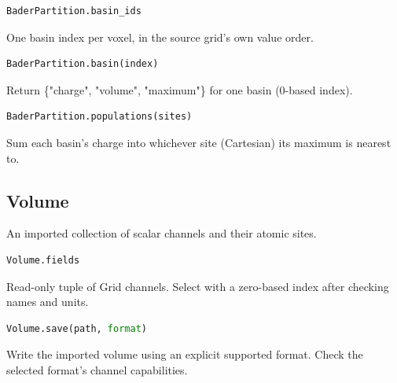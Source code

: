 \begin{samepage}

\begin{lstlisting}[language=Python]
BaderPartition.basin_ids
\end{lstlisting}

One basin index per voxel, in the source grid's own value order.

\end{samepage}



\begin{samepage}

\begin{lstlisting}[language=Python]
BaderPartition.basin(index)
\end{lstlisting}

Return \{"charge", "volume", "maximum"\} for one basin (0-based index).

\end{samepage}



\begin{samepage}

\begin{lstlisting}[language=Python]
BaderPartition.populations(sites)
\end{lstlisting}

Sum each basin's charge into whichever site (Cartesian) its maximum is nearest to.

\end{samepage}



\subsection{Volume}

An imported collection of scalar channels and their atomic sites.

\begin{samepage}

\begin{lstlisting}[language=Python]
Volume.fields
\end{lstlisting}

Read-only tuple of Grid channels. Select with a zero-based index after checking names and units.

\end{samepage}



\begin{samepage}

\begin{lstlisting}[language=Python]
Volume.save(path, format)
\end{lstlisting}

Write the imported volume using an explicit supported format. Check the selected format's channel capabilities.

\end{samepage}



